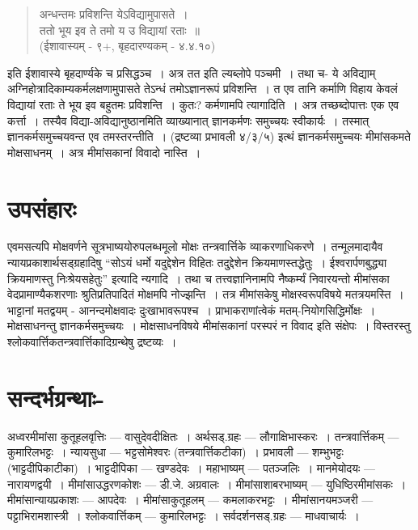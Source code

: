 {\begin{verse}
अन्धन्तमः प्रविशन्ति येऽविद्यामुपासते~। \\
ततो भूय इव ते तमो य उ विद्यायां रताः~॥\\
\hspace{3cm}(ईशावास्यम् - ९+, बृहदारण्यकम् - ४.४.१०)
\end{verse}
इति ईशावास्ये बृहदार्ण्यके च प्रसिद्धञ्च~। अत्र तत इति ल्यब्लोपे पञ्चमी~। तथा च- ये अविद्याम् अग्निहोत्रादिकाम्यकर्मलक्षणामुपासते तेऽन्धं तमोऽज्ञानरूपं प्रविशन्ति~। त एव तानि कर्माणि विहाय केवलं विद्यायां रताः ते भूय इव बहुतमः प्रविशन्ति~। कुतः? कर्मणामपि त्यागादिति~। अत्र तच्छब्दोपात्तः एक एव कर्त्ता~। तस्यैव विद्या-अविद्यानुष्ठानमिति व्याख्यानात् ज्ञानकर्मणः समुच्चयः स्वीकार्यः~। तस्मात् ज्ञानकर्मसमुच्चयवन्त एव तमस्तरन्तीति~। (द्रष्टव्या प्रभावली ४/३/५) इत्थं ज्ञानकर्मसमुच्चयः मीमांसकमते मोक्षसाधनम्~। अत्र मीमांसकानां विवादो नास्ति~। 

\section*{उपसंहारः}

एवमसत्यपि मोक्षवर्णने सूत्रभाष्ययोरुपलब्धमूलो मोक्षः तन्त्रवार्त्तिके व्याकरणाधिकरणे~। तन्मूलमादायैव न्यायप्रकाशार्थसड्ग्रहादिषु “सोऽयं धर्मो यदुद्देशेन विहितः तदु्द्देशेन क्रियमाणस्तद्धेतुः~। ईश्वरार्पणबुद्ध्या क्रियमाणस्तु निःश्रेयसहेतुः” इत्यादि न्यगादि~। तथा च तत्त्वज्ञानिनामपि नैष्कर्म्यं निवारयन्तो मीमांसका वेदप्रामाण्यैकशरणाः श्रुतिप्रतिपादितं मोक्षमपि नोज्झन्ति~। तत्र मीमांसकेषु मोक्षस्वरूपविषये मतत्रयमस्ति~। भाट्टानां मतद्वयम् - आनन्दमोक्षवादः दुःखाभावरूपश्च~। प्राभाकराणांत्वेकं मतम्-नियोगसिद्धिर्मोक्षः~। मोक्षसाधनन्तु ज्ञानकर्मसमुच्चयः~। मोक्षसाधनविषये मीमांसकानां परस्परं न विवाद इति संक्षेपः~। विस्तरस्तु श्लोकवार्त्तिकतन्त्रवार्त्तिकादिग्रन्थेषु द्रष्टव्यः~। 
 
\section*{सन्दर्भग्रन्थाः-} 
 
\begin{thebibliography}{99}
 अध्वरमीमांसा कुतूहलवृत्तिः --- वासुदेवदीक्षितः~। 
 अर्थसड्.ग्रहः --- लौगाक्षिभास्करः~। 
 तन्त्रवार्त्तिकम् --- कुमारिलभट्टः~। 
 न्यायसुधा --- भट्टसोमेश्वरः (तन्त्रवार्त्तिकटीका)~। 
 प्रभावली --- शम्भुभट्टः (भाट्टदीपिकाटीका)~। 
 भाट्टदीपिका --- खण्डदेवः~। 
 महाभाष्यम् --- पतञ्जलिः~। 
 मानमेयोदयः --- नारायणद्वयी~। 
 मीमांसाउद्धरणकोशः --- डी.जे. अग्रवालः~। 
 मीमांसाशाबरभाष्यम् --- युधिष्ठिरमीमांसकः~। 
 मीमांसान्यायप्रकाशः --- आपदेवः~। 
 मीमांसाकुतूहलम् --- कमलाकरभट्टः~। 
 मीमांसानयमञ्जरी --- पट्टाभिरामशास्त्री~। 
 श्लोकवार्त्तिकम् --- कुमारिलभट्टः~। 
 सर्वदर्शनसड्.ग्रहः --- माधवाचार्यः~। 
\end{thebibliography}

\articleend
}

